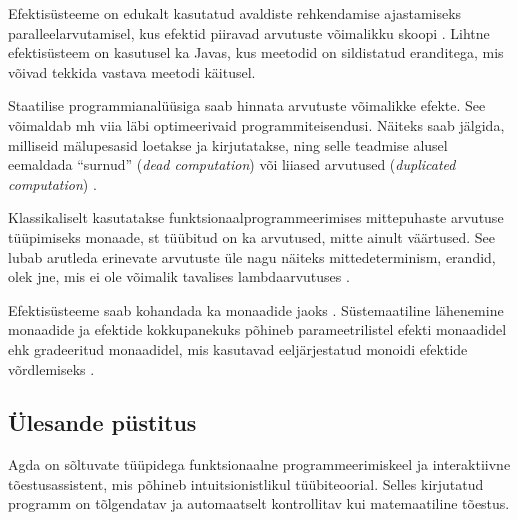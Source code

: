 \documentclass[a4paper,12pt]{article}
\begin{document}
Efektisüsteeme on edukalt kasutatud avaldiste rehkendamise ajastamiseks paralleelarvutamisel, kus efektid piiravad arvutuste võimalikku skoopi \cite{Lucassen1988}.
Lihtne efektisüsteem on kasutusel ka Javas, kus meetodid on sildistatud eranditega, mis võivad tekkida vastava meetodi käitusel. 

Staatilise programmianalüüsiga saab hinnata arvutuste võimalikke efekte.
See võimaldab mh viia läbi optimeerivaid programmiteisendusi.
Näiteks saab jälgida, milliseid mälupesasid loetakse ja kirjutatakse, ning selle teadmise alusel eemaldada ``surnud'' (\emph{dead computation}) või liiased arvutused (\emph{duplicated computation}) \cite{Benton2006}.

Klassikaliselt kasutatakse funktsionaalprogrammeerimises mittepuhaste arvutuse tüüpimiseks monaade, st tüübitud on ka arvutused, mitte ainult väärtused.
See lubab arutleda erinevate arvutuste üle nagu näiteks mittedeterminism, erandid, olek jne, mis ei ole võimalik tavalises lambdaarvutuses \cite{Moggi1989}.

Efektisüsteeme saab kohandada ka monaadide jaoks \cite{Wadler1998}.
Süstemaatiline lähenemine monaadide ja efektide kokkupanekuks põhineb parameetrilistel efekti monaadidel ehk gradeeritud monaadidel, mis kasutavad eeljärjestatud monoidi efektide võrdlemiseks \cite{Katsumata2014}.

\subsection{Ülesande püstitus}




Agda on sõltuvate tüüpidega funktsionaalne programmeerimiskeel ja interaktiivne tõestusassistent,
mis põhineb intuitsionistlikul tüübiteoorial.
Selles kirjutatud programm on tõlgendatav ja automaatselt kontrollitav kui matemaatiline tõestus.
\end{document}
